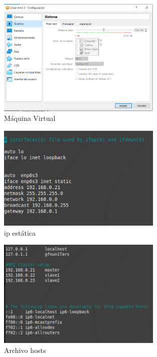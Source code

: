 \begin{figure}[H]
    \centering
  \includegraphics[width=0.7\textwidth]{images/lab3.PNG}
  \caption{Máquina Virtual}
  \label{mv3}
\end{figure}


\begin{figure}[H]
    \centering
  \includegraphics[width=0.7\textwidth]{images/lab4.PNG}
  \caption{ip estática}
  \label{mv4}
\end{figure}


\begin{figure}[H]
    \centering
  \includegraphics[width=0.7\textwidth]{images/lab5.PNG}
  \caption{Archivo hosts}
  \label{mv5}
\end{figure}



\newpage